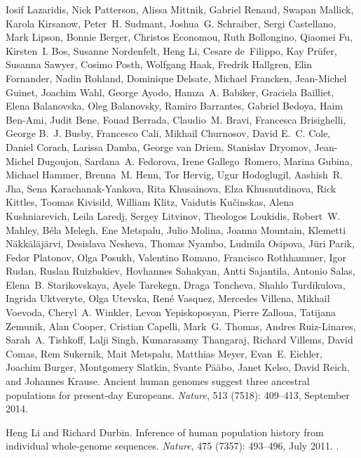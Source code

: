 \documentclass[10pt,letterpaper]{article}
\begin{document}
\begin{thebibliography}{80}
Iosif Lazaridis, Nick Patterson, Alissa Mittnik, Gabriel Renaud, Swapan
  Mallick, Karola Kirsanow, Peter~H. Sudmant, Joshua~G. Schraiber, Sergi
  Castellano, Mark Lipson, Bonnie Berger, Christos Economou, Ruth Bollongino,
  Qiaomei Fu, Kirsten~I. Bos, Susanne Nordenfelt, Heng Li, Cesare de~Filippo,
  Kay Prüfer, Susanna Sawyer, Cosimo Posth, Wolfgang Haak, Fredrik Hallgren,
  Elin Fornander, Nadin Rohland, Dominique Delsate, Michael Francken,
  Jean-Michel Guinet, Joachim Wahl, George Ayodo, Hamza~A. Babiker, Graciela
  Bailliet, Elena Balanovska, Oleg Balanovsky, Ramiro Barrantes, Gabriel
  Bedoya, Haim Ben-Ami, Judit Bene, Fouad Berrada, Claudio~M. Bravi, Francesca
  Brisighelli, George B.~J. Busby, Francesco Cali, Mikhail Churnosov, David
  E.~C. Cole, Daniel Corach, Larissa Damba, George van Driem, Stanislav
  Dryomov, Jean-Michel Dugoujon, Sardana~A. Fedorova, Irene Gallego~Romero,
  Marina Gubina, Michael Hammer, Brenna~M. Henn, Tor Hervig, Ugur Hodoglugil,
  Aashish~R. Jha, Sena Karachanak-Yankova, Rita Khusainova, Elza Khusnutdinova,
  Rick Kittles, Toomas Kivisild, William Klitz, Vaidutis Kučinskas, Alena
  Kushniarevich, Leila Laredj, Sergey Litvinov, Theologos Loukidis, Robert~W.
  Mahley, Béla Melegh, Ene Metspalu, Julio Molina, Joanna Mountain, Klemetti
  Näkkäläjärvi, Desislava Nesheva, Thomas Nyambo, Ludmila Osipova, Jüri
  Parik, Fedor Platonov, Olga Posukh, Valentino Romano, Francisco Rothhammer,
  Igor Rudan, Ruslan Ruizbakiev, Hovhannes Sahakyan, Antti Sajantila, Antonio
  Salas, Elena~B. Starikovskaya, Ayele Tarekegn, Draga Toncheva, Shahlo
  Turdikulova, Ingrida Uktveryte, Olga Utevska, René Vasquez, Mercedes
  Villena, Mikhail Voevoda, Cheryl~A. Winkler, Levon Yepiskoposyan, Pierre
  Zalloua, Tatijana Zemunik, Alan Cooper, Cristian Capelli, Mark~G. Thomas,
  Andres Ruiz-Linares, Sarah~A. Tishkoff, Lalji Singh, Kumarasamy Thangaraj,
  Richard Villems, David Comas, Rem Sukernik, Mait Metspalu, Matthias Meyer,
  Evan~E. Eichler, Joachim Burger, Montgomery Slatkin, Svante Pääbo, Janet
  Kelso, David Reich, and Johannes Krause.
\newblock Ancient human genomes suggest three ancestral populations for
  present-day {Europeans}.
\newblock \emph{Nature}, 513 (7518): 409--413, September
  2014.

Heng Li and Richard Durbin.
\newblock Inference of human population history from individual whole-genome
  sequences.
\newblock \emph{Nature}, 475 (7357): 493--496, July 2011.
\newblock {}.


\end{thebibliography}
\end{document}
